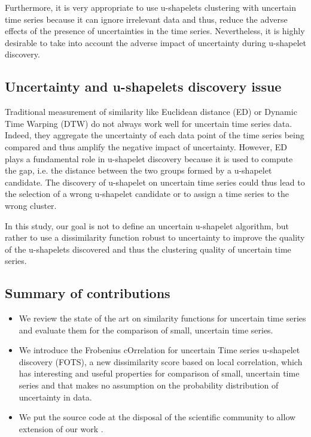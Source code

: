 Furthermore, it is very appropriate to use u-shapelets clustering with uncertain time series because it can ignore irrelevant data and thus, reduce the adverse effects of the presence of uncertainties in the time series. Nevertheless, it is highly desirable to take into account the adverse impact of uncertainty during u-shapelet discovery.

\subsection{Uncertainty and u-shapelets discovery issue}
Traditional measurement of similarity like Euclidean distance (ED) or Dynamic Time  Warping (DTW) do not always work well for uncertain time series data. Indeed,   they aggregate the uncertainty of each data point of the time series being compared and thus amplify the negative impact of uncertainty. However, ED plays a   fundamental role in u-shapelet discovery because it is used to compute the gap, i.e. the distance between the two groups formed by a u-shapelet candidate. The discovery of u-shapelet on uncertain time series could thus lead to the selection of a wrong u-shapelet candidate or to assign a time series to the wrong cluster.
 
 
 In this study, our goal is not to define an uncertain  u-shapelet algorithm, but rather to use a dissimilarity function robust to uncertainty to improve the quality of the u-shapelets discovered and thus the clustering quality of uncertain time series.
 

\subsection{Summary of contributions}

\begin{itemize}
  \item We review the state of the art on similarity functions for uncertain time
  series and evaluate them for the comparison of small, uncertain time series.  
  \item We introduce the Frobenius cOrrelation for uncertain Time series u-shapelet
  discovery (FOTS), a  new dissimilarity score based on local correlation, which
  has interesting and useful properties  for comparison of small, uncertain  time
  series and that makes no assumption on the probability distribution of
  uncertainty in data.
\item We put the source code at the disposal of the scientific community to allow extension of our work \cite{expe}.
\end{itemize}














